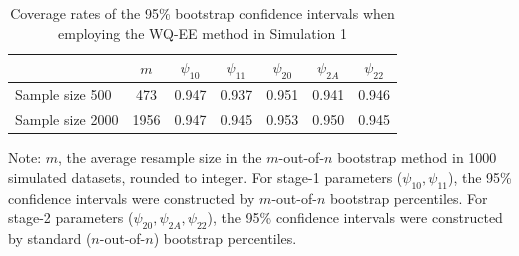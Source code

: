 \documentclass[12pt]{article}
\begin{document}

\begin{table}[htbp]
  \centering
  \caption{Coverage rates of  the 95\% bootstrap  confidence intervals when employing the WQ-EE method in Simulation 1}
  \begin{threeparttable}
    \begin{tabular}{lcccccc}
    \hline
    &$m$ & $\psi_{10}$ & $\psi_{11}$ & $\psi_{20}$ & $\psi_{2A}$ & $\psi_{22}$ \\
    \hline
     Sample size 500 & 473 & 0.947 & 0.937 & 0.951 & 0.941 & 0.946 \\
     Sample size 2000 & 1956 & 0.947 & 0.945 & 0.953 & 0.950 & 0.945 \\
    \hline
    \end{tabular}
\begin{tablenotes}
    \small
    \item Note: $m$, the average  resample size in the $m$-out-of-$n$ bootstrap method in 1000 simulated datasets, rounded to integer.   For stage-1 parameters ($\psi_{10}, \psi_{11}$), the 95\% confidence intervals were constructed by $m$-out-of-$n$ bootstrap percentiles. For stage-2 parameters ($\psi_{20}, \psi_{2A}, \psi_{22}$), the 95\% confidence intervals were constructed by standard ($n$-out-of-$n$) bootstrap percentiles. 
\end{tablenotes}
  \end{threeparttable}
  \label{WQ-EE_CI_coverage}%
\end{table}%
\end{document}
